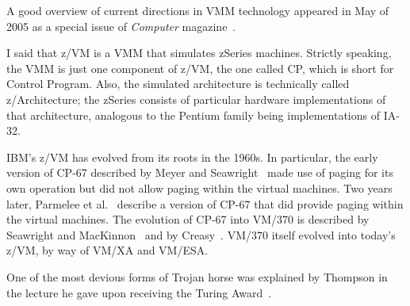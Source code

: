 A good overview of current directions in VMM technology appeared in
May of 2005 as a special issue of {\em Computer} magazine~\cite{max1174}.

I said that z/VM is a VMM that simulates zSeries machines.
Strictly speaking, the VMM is just one
component of z/VM, the one called CP, which is short for Control Program.  Also, the simulated architecture is
technically called z/Architecture; the zSeries
consists of particular hardware implementations of that architecture,
analogous to the Pentium family being implementations of IA-32.

IBM's z/VM has evolved from its roots in
the 1960s.  In particular, the early version of CP-67 described by
Meyer and Seawright~\cite{max1100} made use of paging for its own
operation but did not allow paging within the virtual machines.  Two
years later, Parmelee et al.~\cite{max1099} describe a
version of CP-67 that did provide paging within the virtual machines.
The evolution of CP-67 into VM/370 is described by Seawright and MacKinnon~\cite{max1098}
and by Creasy~\cite{max1097}.  VM/370 itself
evolved into today's z/VM, by way of VM/XA and VM/ESA.

One of the most devious forms of Trojan horse was explained by
Thompson in the lecture he gave upon receiving the Turing
Award~\cite{max538}.
